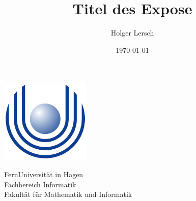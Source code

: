 \documentclass[a4paper,oneside,11pt]{book}
\title{Titel des Expose}
\author{Holger Lersch}
\date{\today}
\begin{document}
\begin{titlingpage} %
\begin{center}
\includegraphics[height=4cm]{images/Uni_hagen_logo}\\ %
\begin{large}
FernUniversit\"at in Hagen \\ %
Fachbereich Informatik\\
Fakult\"at f\"ur Mathematik und Informatik\\
\end{large}
\vspace{4cm} %
\begin{large} 
\textbf{\thetitle} \\
\end{large}
\theauthor\\
\vspace{7cm} %
\thedate
\end{center}
\end{titlingpage}
\end{document}
